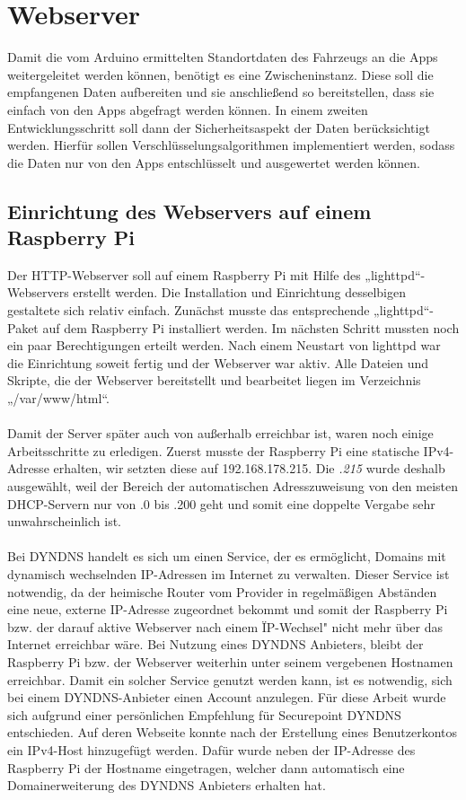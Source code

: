 \section{Webserver}

Damit die vom Arduino ermittelten Standortdaten des Fahrzeugs an die Apps weitergeleitet werden können, benötigt es eine Zwischeninstanz. Diese soll die empfangenen Daten aufbereiten und sie anschließend so bereitstellen, dass sie einfach von den Apps abgefragt werden können.
In einem zweiten Entwicklungsschritt soll dann der Sicherheitsaspekt der Daten berücksichtigt werden. Hierfür sollen Verschlüsselungsalgorithmen implementiert werden, sodass die Daten nur von den Apps entschlüsselt und ausgewertet werden können.

\subsection{Einrichtung des Webservers auf einem Raspberry Pi}
Der HTTP-Webserver soll auf einem Raspberry Pi mit Hilfe des „lighttpd“-Webservers erstellt werden. Die Installation und Einrichtung desselbigen gestaltete sich relativ einfach. Zunächst musste das entsprechende „lighttpd“-Paket auf dem Raspberry Pi installiert werden. Im nächsten Schritt mussten noch ein paar Berechtigungen erteilt werden. Nach einem Neustart von lighttpd war die Einrichtung soweit fertig und der Webserver war aktiv. Alle Dateien und Skripte, die der Webserver bereitstellt und bearbeitet liegen im Verzeichnis „/var/www/html“.
\\
\\
Damit der Server später auch von außerhalb erreichbar ist, waren noch einige Arbeitsschritte zu erledigen. Zuerst musste der Raspberry Pi eine statische IPv4-Adresse erhalten, wir setzten diese auf 192.168.178.215. Die \textit{.215} wurde deshalb ausgewählt, weil der Bereich der automatischen Adresszuweisung von den meisten DHCP-Servern nur von .0 bis .200 geht und somit eine doppelte Vergabe sehr unwahrscheinlich ist.
\\
\\
Bei DYNDNS handelt es sich um einen Service, der es ermöglicht, Domains mit dynamisch wechselnden IP-Adressen im Internet zu verwalten. Dieser Service ist notwendig, da der heimische Router vom Provider in regelmäßigen Abständen eine neue, externe IP-Adresse zugeordnet bekommt und somit der Raspberry Pi bzw. der darauf aktive Webserver nach einem \"IP-Wechsel" nicht mehr über das Internet erreichbar wäre. Bei Nutzung eines DYNDNS Anbieters, bleibt der Raspberry Pi bzw. der Webserver weiterhin unter seinem vergebenen Hostnamen erreichbar. Damit ein solcher Service genutzt werden kann, ist es notwendig, sich bei einem DYNDNS-Anbieter einen Account anzulegen. Für diese Arbeit wurde sich aufgrund einer persönlichen Empfehlung für Securepoint DYNDNS entschieden. Auf deren Webseite konnte nach der Erstellung eines Benutzerkontos ein IPv4-Host hinzugefügt werden. Dafür wurde neben der IP-Adresse des Raspberry Pi der Hostname eingetragen, welcher dann automatisch eine Domainerweiterung des DYNDNS Anbieters erhalten hat.
